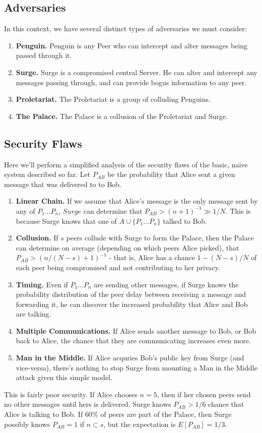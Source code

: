 \documentclass{paper}
\begin{document}
\subsection{Adversaries}
In this context, we have several distinct types of adversaries we must consider:
\begin{enumerate}
  \item\textbf{Penguin.} Penguin is any Peer who can intercept and alter messages being passed through it. 
  \item\textbf{Surge.} Surge is a compromised central Server. He can alter and intercept any messages passing through, and can provide bogus information to any peer.
  \item\textbf{Proletariat.} The Proletariat is a group of colluding Penguins.
  \item\textbf{The Palace.} The Palace is a collusion of the Proletariat and Surge.
\end{enumerate}
\subsection{Security Flaws}
Here we'll perform a simplified analysis of the security flaws of the basic, naive system described so far. 
Let $P_{AB}$ be the probability that Alice sent a given message that was delivered to to Bob. 
\begin{enumerate}
\item\textbf{Linear Chain.} If we assume that Alice's message is the only message sent by any of $P_1 ... P_n$, $Surge$ can determine that $P_{AB} > (n+1)^{-1} \gg 1/N$. This is because Surge knows that one of $A \cup \{P_1 ... P_n\}$ talked to Bob.
\item\textbf{Collusion.} If  $s$ peers collude with Surge to form the Palace, then the Palace can determine on average (depending on which peers Alice picked), that $P_{AB} > (n/(N-s)+1)^{-1}$ - that is, Alice has a chance $1 - (N-s)/N$ of each peer being compromised and not contributing to her privacy.
\item\textbf{Timing.} Even if $P_1 ... P_n$ are sending other messages, if Surge knows the probability distribution of the peer delay between receiving a message and forwarding it, he can discover the increased probability that Alice and Bob are talking. 
\item\textbf{Multiple Communications.} If Alice sends another message to Bob, or Bob back to Alice, the chance that they are communicating increases even more. 
\item\textbf{Man in the Middle.} If Alice acquries Bob's public key from Surge (and vice-versa), there's nothing to stop Surge from mounting a Man in the Middle attack given this simple model. 
\end{enumerate}
This is fairly poor security. If Alice chooses $n = 5$, then if her chosen peers send no other messages until hers is delivered, Surge knows $P_{AB} > 1/6$ chance that Alice is talking to Bob. If $60\%$ of peers are part of the Palace, then Surge possibly knows $P_{AB} = 1$ if $n \subset s$, but the expectation is $E[P_{AB}] = 1/3$.
\end{document}
